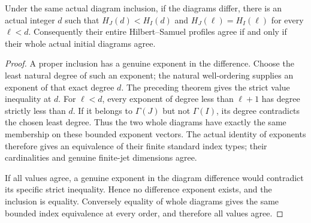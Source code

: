 \begin{theorem}
\label{hir:actual-diagram-first-strict-hs-drop-and-rigidity}
\leanok
Under the same actual diagram inclusion, if the diagrams differ,
there is an actual integer $d$ such that $H_J(d)<H_I(d)$ and
$H_J(\ell)=H_I(\ell)$ for every $\ell<d$. Consequently their entire
Hilbert--Samuel profiles agree if and only if their whole actual
initial diagrams agree.
\end{theorem}
\begin{proof}
A proper inclusion has a genuine exponent in the difference.
Choose the least natural degree of such an exponent; the natural
well-ordering supplies an exponent of that exact degree $d$.
The preceding theorem gives the strict value inequality at $d$.
For $\ell<d$, every exponent of degree less than $\ell+1$ has degree
strictly less than $d$. If it belongs to $\Gamma(J)$ but not
$\Gamma(I)$, its degree contradicts the chosen least degree.
Thus the two whole diagrams have exactly the same membership on
these bounded exponent vectors. The actual identity of exponents
therefore gives an equivalence of their finite standard index types;
their cardinalities and genuine finite-jet dimensions agree.

If all values agree, a genuine exponent in the diagram difference
would contradict its specific strict inequality. Hence no difference
exponent exists, and the inclusion is equality. Conversely equality
of whole diagrams gives the same bounded index equivalence at every
order, and therefore all values agree.
\end{proof}


